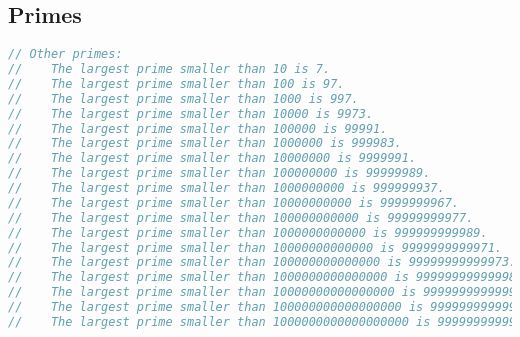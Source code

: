 \subsection{Primes}
\begin{lstlisting}[language=C++]
// Other primes:
//    The largest prime smaller than 10 is 7.
//    The largest prime smaller than 100 is 97.
//    The largest prime smaller than 1000 is 997.
//    The largest prime smaller than 10000 is 9973.
//    The largest prime smaller than 100000 is 99991.
//    The largest prime smaller than 1000000 is 999983.
//    The largest prime smaller than 10000000 is 9999991.
//    The largest prime smaller than 100000000 is 99999989.
//    The largest prime smaller than 1000000000 is 999999937.
//    The largest prime smaller than 10000000000 is 9999999967.
//    The largest prime smaller than 100000000000 is 99999999977.
//    The largest prime smaller than 1000000000000 is 999999999989.
//    The largest prime smaller than 10000000000000 is 9999999999971.
//    The largest prime smaller than 100000000000000 is 99999999999973.
//    The largest prime smaller than 1000000000000000 is 999999999999989.
//    The largest prime smaller than 10000000000000000 is 9999999999999937.
//    The largest prime smaller than 100000000000000000 is 99999999999999997.
//    The largest prime smaller than 1000000000000000000 is 999999999999999989.
\end{lstlisting}